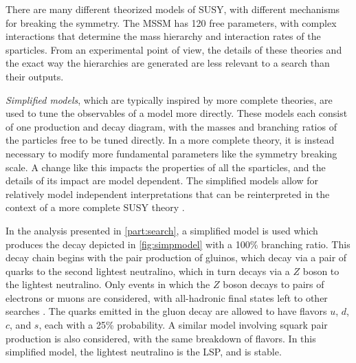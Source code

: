 There are many different theorized models of \ac{SUSY}, with different mechanisms for breaking the symmetry. The \ac{MSSM} has 120 free parameters, with complex interactions that determine the mass hierarchy and interaction rates of the sparticles. From an experimental point of view, the details of these theories and the exact way the hierarchies are generated are less relevant to a search than their outputs. 

\textit{Simplified models}, which are typically inspired by more complete theories, are used to tune the observables of a model more directly. These models each consist of one production and decay diagram, with the masses and branching ratios of the particles free to be tuned directly. In a more complete theory, it is instead necessary to modify more fundamental parameters like the symmetry breaking scale. A change like this impacts the properties of all the sparticles, and the details of its impact are model dependent. The simplified models allow for relatively model independent interpretations that can be reinterpreted in the context of a more complete \ac{SUSY} theory \cite{1608.00872}.

In the analysis presented in \autoref{part:search}, a simplified model is used which produces the decay depicted in \autoref{fig:simpmodel} with a 100\% branching ratio. This decay chain begins with the pair production of gluinos, which decay via a pair of quarks to the second lightest neutralino, which in turn decays via a $Z$ boson to the lightest neutralino. Only events in which the $Z$ boson decays to pairs of electrons or muons are considered, with all-hadronic final states left to other searches \cite{ATLAS:2016kts}. The quarks emitted in the gluon decay are allowed to have flavors $u$, $d$, $c$, and $s$, each with a 25\% probability. A similar model involving squark pair production is also considered, with the same breakdown of flavors. In this simplified model, the lightest neutralino is the \ac{LSP}, and is stable. 


